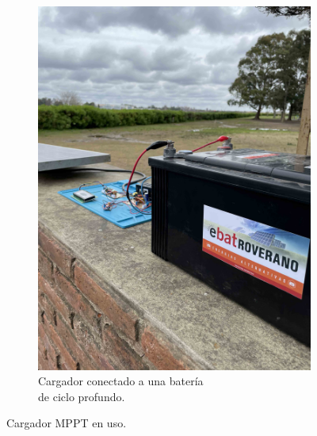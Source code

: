 \begin{figure}[H]
\begin{subfigure}{0.5\textwidth}
        \includegraphics[width=0.9\linewidth]{MPPT/IMG_8915.jpg}
        \caption{Cargador conectado a una batería\\ de ciclo profundo.}
        \label{fig:MPPT-bateria}
    \end{subfigure}
\caption{Cargador MPPT en uso.}
\end{figure}

